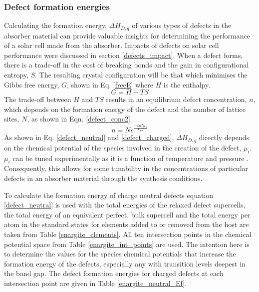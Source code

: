 \documentclass[11pt, twoside]{report}
\begin{document}
\subsubsection{Defect formation energies}
Calculating the formation energy, $\Delta H_{D,q}$ of various types of defects in the absorber material can provide valuable insights for determining the performance of a solar cell made from the absorber. Impacts of defects on solar cell performance were discussed in section \ref{defects_impact}. When a defect forms, there is a trade-off in the cost of breaking bonds and the gain in configurational entropy, $S$. The resulting crystal configuration will be that which minimises the Gibbs free energy, $G$, shown in Eq. \ref{freeE} where $H$ is the enthalpy. 
\begin{equation}\label{freeE}
G = H - TS
\end{equation}
The trade-off between $H$ and $TS$ results in an equilibrium defect concentration, $n$, which depends on the formation energy of the defect and the number of lattice sites, $N$, as shown in Eqn. \ref{defect_conc2}.
\begin{equation}\label{defect_conc2}
n = N e^{\frac{-\Delta H_{D,q}}{k_B T}}
\end{equation}
As shown in Eq. \ref{defect_neutral} and \ref{defect_charged}, $\Delta H_{D,q}$ directly depends on the chemical potential of the species involved in the creation of the defect, $\mu_i$. $\mu_i$ can be tuned experimentally as it is a function of temperature and pressure \cite{Adam_sulfur}. Consequently, this allows for some tunability in the concentrations of particular defects in an absorber material through the synthesis conditions.

To calculate the formation energy of charge neutral defects equation \ref{defect_neutral} is used with the total energies of the relaxed defect supercells, the total energy of an equivalent perfect, bulk supercell and the total energy per atom in the standard states for elements added to or removed from the host are taken from Table \ref{enargite_elements}. All ten intersection points in the chemical potential space from Table \ref{enargite_int_points} are used. The intention here is to determine the values for the species chemical potentials that increase the formation energy of the defects, especially any with transition levels deepest in the band gap. The defect formation energies for charged defects at each intersection point are given in Table \ref{enargite_neutral_Ef}.\\
\end{document}
